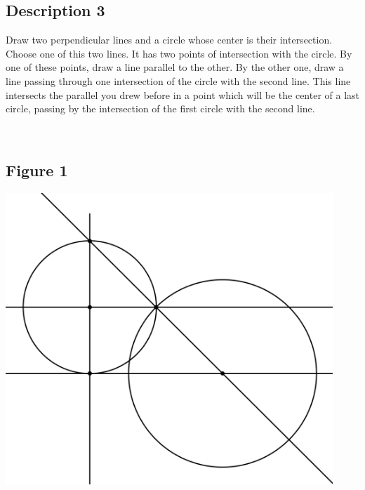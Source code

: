 \documentclass[12pt,a4paper,article,english,firamath]{nsi}
\begin{document}
\maketitle

\subsection*{Description 3}
{\brettley 

Draw two perpendicular lines and a circle whose center is their intersection.
Choose one of this two lines. It has two points of intersection with the circle. By one of these points, draw a line parallel to the other. By the other one, draw a line passing through one intersection of the circle with the second line. This line intersects the parallel you drew before in a point which will be the center of a last circle, passing by the intersection of the first circle with the second line.}\\


\subsection*{Figure 1}
\begin{center}
    \includegraphics[height=11cm]{img/fig03.png}
\end{center}
\end{document}
